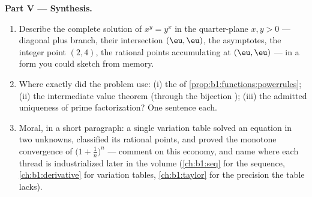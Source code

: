 \begin{problem}
\medskip
\noindent\textbf{Part V --- Synthesis.}
\begin{enumerate}[resume]
  \item Describe the complete solution  of $x^y = y^x$ in the
        quarter-plane $x, y > 0$ --- diagonal plus branch, their
        intersection $(\eu, \eu)$, the asymptotes, the integer
        point $(2, 4)$, the rational points accumulating at
        $(\eu, \eu)$ --- in a form you could sketch from memory.
  \item Where exactly did the problem use: (i) the  of \cref{prop:b1:functions:powerrules}; (ii)
        the intermediate value theorem (through the bijection
        ); (iii) the admitted uniqueness of prime
        factorization? One sentence each.
  \item Moral, in a short paragraph: a single variation table
        solved an equation in two unknowns, classified its
        rational points, and proved the monotone convergence of
        $\bigl(1 + \frac1n\bigr)^n$ --- comment on this economy,
        and name where each thread is industrialized later in the
        volume (\cref{ch:b1:seq} for the sequence,
        \cref{ch:b1:derivative} for variation tables,
        \cref{ch:b1:taylor} for the precision the table lacks).
\end{enumerate}
\end{problem}

